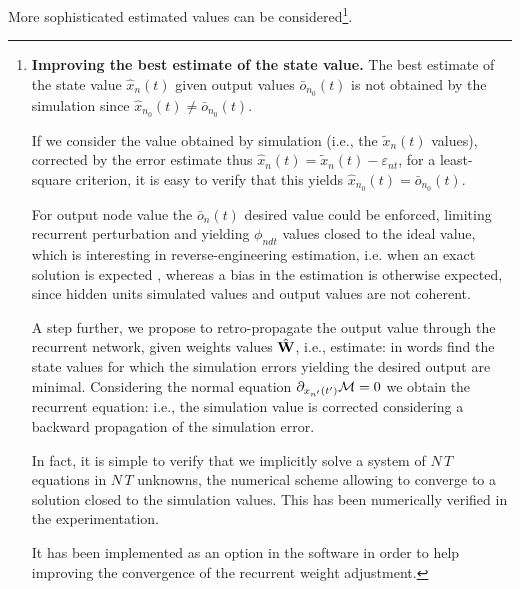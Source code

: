 More sophisticated estimated values can be considered\footnote{\label{improvingstate}{\bf Improving the best estimate of the state value.} The best estimate of the state value $\hat{x}_n(t)$ given output values $\bar{o}_{n_0}(t)$ is not obtained by the simulation since $\hat{x}_{n_0}(t) \neq \bar{o}_{n_0}(t)$.

If we consider the value obtained by simulation (i.e., the $\tilde{x}_n(t)$ values), corrected by the error estimate thus $\hat{x}_n(t) = \tilde{x}_n(t) - \varepsilon_{nt}$, for a least-square criterion, it is easy to verify that this yields $\hat{x}_{n_0}(t) = \bar{o}_{n_0}(t)$. 

For output node value the $\bar{o}_n(t)$ desired value could be enforced, limiting recurrent perturbation and yielding $\phi_{ndt}$ values closed to the ideal value, which is interesting in reverse-engineering estimation, i.e. when an exact solution is expected \cite{rostro-gonzalez-cessac-etal:10}, whereas a bias in the estimation is otherwise expected, since hidden units simulated values and output values are not coherent.

A step further, we propose to retro-propagate the output value through the recurrent network, given weights values $\hat{\bf W}$, i.e., estimate:
in words find the state values for which the simulation errors yielding the desired output are minimal. Considering the normal equation $\partial_{x_{n'}(t')} {\cal M} = 0$ we obtain the recurrent equation:
i.e., the simulation value is corrected considering a backward propagation of the simulation error.

In fact, it is simple to verify that we implicitly solve a system of $N\,T$ equations in $N\,T$ unknowns, the numerical scheme allowing to converge to a solution closed to the simulation values. This has been numerically verified in the experimentation.

It has been implemented as an option in the software in order to help improving the convergence of the recurrent weight adjustment. \hr}.


